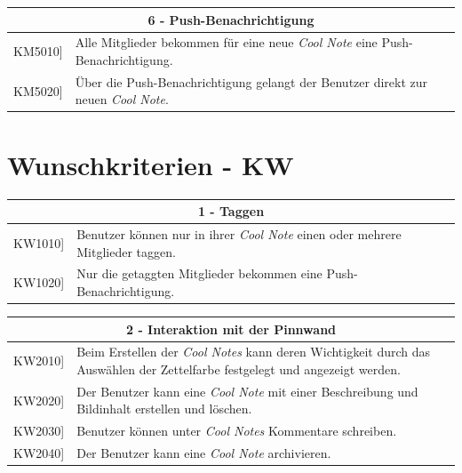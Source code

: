 \documentclass[a4paper]{scrreprt}
\begin{document}
    	\vspace{5mm}
    	
    	\begin{table}[h!]
    		\centering
    		\label{my-label}
    		\begin{tabular}{p{2cm}p{12cm}}
    			
    			\multicolumn{2}{c}{\textbf{6 - Push-Benachrichtigung}} \\ \hline
    			\centering{[}KM5010{]} & Alle Mitglieder bekommen für eine neue \textit{Cool Note} eine Push-Benachrichtigung.\\
    			\centering{[}KM5020{]}& Über die Push-Benachrichtigung gelangt der Benutzer direkt zur neuen \textit{Cool Note}.                               \\
    			
    			\hline
    		\end{tabular}
    	\end{table}
    	
    	\vspace{1cm}    	

        \section{Wunschkriterien - KW}
		\begin{table}[h!]
			\centering
			\label{my-label}
			\begin{tabular}{p{2cm}p{12cm}}
				
				\multicolumn{2}{c}{\textbf{1 - Taggen}} \\ \hline
				\centering{[}KW1010{]} & Benutzer können nur in ihrer \textit{Cool Note} einen oder mehrere Mitglieder taggen.\\
				\centering{[}KW1020{]}& Nur die getaggten Mitglieder bekommen eine Push-Benachrichtigung.                               \\
				\hline
			\end{tabular}
		\end{table}
		
		\vspace{5mm}
		
		\begin{table}[h!]
			\centering
			\label{my-label}
			\begin{tabular}{p{2cm}p{12cm}}
				
				\multicolumn{2}{c}{\textbf{2 - Interaktion mit der Pinnwand}} \\ \hline
				\centering{[}KW2010{]} & Beim Erstellen der \textit{Cool Notes} kann deren Wichtigkeit durch das Auswählen der Zettelfarbe festgelegt und angezeigt werden.\\
				\centering{[}KW2020{]}& Der Benutzer kann eine \textit{Cool Note} mit einer Beschreibung und Bildinhalt erstellen und löschen.                              \\
				\centering{[}KW2030{]}& Benutzer können unter \textit{Cool Notes} Kommentare schreiben.\\ 
				\centering{[}KW2040{]}& Der Benutzer kann eine \textit{Cool Note} archivieren.\\ 
				\hline
			\end{tabular}
		\end{table}
		
\end{document}
